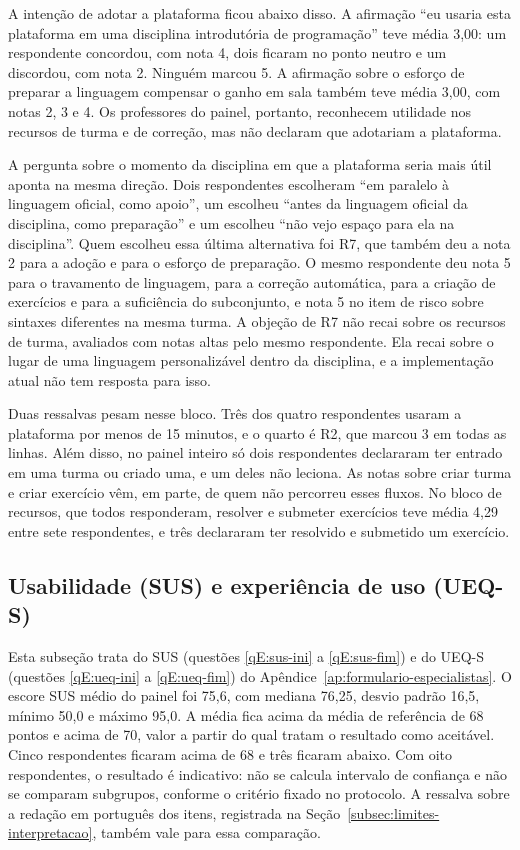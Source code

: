 A intenção de adotar a plataforma ficou abaixo disso. A afirmação ``eu usaria esta plataforma em uma disciplina introdutória de programação'' teve média 3,00: um respondente concordou, com nota 4, dois ficaram no ponto neutro e um discordou, com nota 2. Ninguém marcou 5. A afirmação sobre o esforço de preparar a linguagem compensar o ganho em sala também teve média 3,00, com notas 2, 3 e 4. Os professores do painel, portanto, reconhecem utilidade nos recursos de turma e de correção, mas não declaram que adotariam a plataforma.

A pergunta sobre o momento da disciplina em que a plataforma seria mais útil aponta na mesma direção. Dois respondentes escolheram ``em paralelo à linguagem oficial, como apoio'', um escolheu ``antes da linguagem oficial da disciplina, como preparação'' e um escolheu ``não vejo espaço para ela na disciplina''. Quem escolheu essa última alternativa foi R7, que também deu a nota 2 para a adoção e para o esforço de preparação. O mesmo respondente deu nota 5 para o travamento de linguagem, para a correção automática, para a criação de exercícios e para a suficiência do subconjunto, e nota 5 no item de risco sobre sintaxes diferentes na mesma turma. A objeção de R7 não recai sobre os recursos de turma, avaliados com notas altas pelo mesmo respondente. Ela recai sobre o lugar de uma linguagem personalizável dentro da disciplina, e a implementação atual não tem resposta para isso.

Duas ressalvas pesam nesse bloco. Três dos quatro respondentes usaram a plataforma por menos de 15 minutos, e o quarto é R2, que marcou 3 em todas as linhas. Além disso, no painel inteiro só dois respondentes declararam ter entrado em uma turma ou criado uma, e um deles não leciona. As notas sobre criar turma e criar exercício vêm, em parte, de quem não percorreu esses fluxos. No bloco de recursos, que todos responderam, resolver e submeter exercícios teve média 4,29 entre sete respondentes, e três declararam ter resolvido e submetido um exercício.

\subsection{Usabilidade (SUS) e experiência de uso (UEQ-S)}
\label{sec:resultado-usabilidade}

Esta subseção trata do SUS (questões \ref{qE:sus-ini} a \ref{qE:sus-fim}) e do UEQ-S (questões \ref{qE:ueq-ini} a \ref{qE:ueq-fim}) do Apêndice~\ref{ap:formulario-especialistas}. O escore SUS médio do painel foi 75,6, com mediana 76,25, desvio padrão 16,5, mínimo 50,0 e máximo 95,0. A média fica acima da média de referência de 68 pontos \cite{sauro2012} e acima de 70, valor a partir do qual  tratam o resultado como aceitável. Cinco respondentes ficaram acima de 68 e três ficaram abaixo. Com oito respondentes, o resultado é indicativo: não se calcula intervalo de confiança e não se comparam subgrupos, conforme o critério fixado no protocolo. A ressalva sobre a redação em português dos itens, registrada na Seção~\ref{subsec:limites-interpretacao}, também vale para essa comparação.

